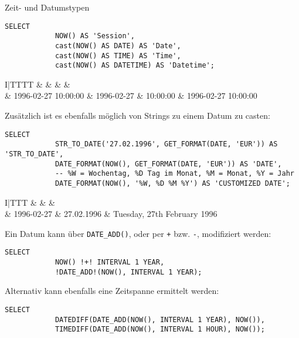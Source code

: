 \begin{sql}{Zeit- und Datumstypen}
    \begin{lstlisting}[language=mysql]
        SELECT
            NOW() AS 'Session',
            cast(NOW() AS DATE) AS 'Date',
            cast(NOW() AS TIME) AS 'Time',
            cast(NOW() AS DATETIME) AS 'Datetime';
    \end{lstlisting}

    \setcounter{rownum}{0}
    \begin{tabular}{I|TTTT}
        &  &  &  &  \\ & 1996-02-27 10:00:00 & 1996-02-27 & 10:00:00 & 1996-02-27 10:00:00 \\
    \end{tabular}

    Zusätzlich ist es ebenfalls möglich von Strings zu einem Datum zu casten:

    \begin{lstlisting}[language=mysql]
        SELECT
            STR_TO_DATE('27.02.1996', GET_FORMAT(DATE, 'EUR')) AS 'STR_TO_DATE',
            DATE_FORMAT(NOW(), GET_FORMAT(DATE, 'EUR')) AS 'DATE',
            -- %W = Wochentag, %D Tag im Monat, %M = Monat, %Y = Jahr
            DATE_FORMAT(NOW(), '%W, %D %M %Y') AS 'CUSTOMIZED DATE';
    \end{lstlisting}

    \setcounter{rownum}{0}
    \begin{tabular}{I|TTT}
        &  &  &  \\ & 1996-02-27 & 27.02.1996 & Tuesday, 27th February 1996 \\
    \end{tabular}

    Ein Datum kann über \lstinline[language=mysql]{DATE_ADD()}, oder per \texttt{+} bzw. \texttt{-}, modifiziert werden:

    \begin{lstlisting}[language=mysql]
        SELECT
            NOW() !+! INTERVAL 1 YEAR,
            !DATE_ADD!(NOW(), INTERVAL 1 YEAR);
    \end{lstlisting}

    Alternativ kann ebenfalls eine Zeitspanne ermittelt werden:

    \begin{lstlisting}[language=mysql]
        SELECT
            DATEDIFF(DATE_ADD(NOW(), INTERVAL 1 YEAR), NOW()),
            TIMEDIFF(DATE_ADD(NOW(), INTERVAL 1 HOUR), NOW());
    \end{lstlisting}
\end{sql}

